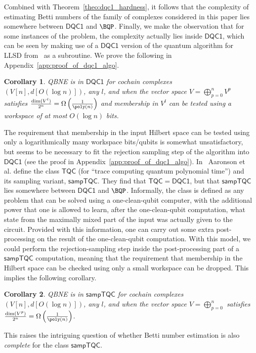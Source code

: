 \documentclass[11pt]{article}
\numberwithin{equation}{section}
\newcommand{\DQC}{\mathsf{DQC1}}
\renewcommand\( {\left(}
\renewcommand\) {\right)}
\newtheorem{corollary}{Corollary}
\begin{document}
Combined with Theorem~\ref{theo:dqc1_hardness}, it follows that the complexity of estimating Betti numbers of the family of complexes considered in this paper lies somewhere between $\DQC$ and $\BQP$. Finally, we make the observation that for some instances of the problem, the complexity actually lies inside $\DQC$, which can be seen by making use of a $\DQC$ version of the quantum algorithm for {\sc LLSD} from~\cite{gyurik} as a subroutine. We prove the following in Appendix~\ref{app:proof_of_dqc1_algo}.

\begin{corollary}\label{cor:dqc1_betti_algo}
	{\sc QBNE} is in $\DQC$ for cochain complexes $(V[n],d[O(\log n)])$, any $l$, and when the vector space $V = \bigoplus_{p=0}^n V^p$ satisfies $\frac{\dim(V^l)}{2^n} = \Omega\left(\frac{1}{\poly(n)}\right)$ \emph{and} membership in $V^l$ can be tested using a workspace of at most $O(\log n)$ bits.
\end{corollary}
The requirement that membership in the input Hilbert space can be tested using only a logarithmically many workspace bits/qubits is somewhat unsatisfactory, but seems to be necessary to fit the rejection sampling step of the algorithm into $\DQC$ (see the proof in Appendix~\ref{app:proof_of_dqc1_algo}). In~\cite{aaronson2017computational} Aaronson et al. define the class $\mathsf{TQC}$ (for ``trace computing quantum polynomial time'') and its sampling variant, $\mathsf{sampTQC}$. They find that $\mathsf{TQC} = \DQC$, but that $\mathsf{sampTQC}$  lies somewhere between $\DQC$ and $\BQP$. Informally, the class is defined as any problem that can be solved using a one-clean-qubit computer, with the additional power that one is allowed to learn, after the one-clean-qubit computation, what state from the maximally mixed part of the input was actually given to the circuit. Provided with this information, one can carry out some extra post-processing on the result of the one-clean-qubit computation. With this model, we could perform the rejection-sampling step inside the post-processing part of a $\mathsf{sampTQC}$ computation, meaning that the requirement that membership in the Hilbert space can be checked using only a small workspace can be dropped. This implies the following corollary.
\begin{corollary}
	{\sc QBNE} is in $\mathsf{sampTQC}$ for cochain complexes $(V[n],d[O(\log n)])$, any $l$, and when the vector space $V = \bigoplus_{p=0}^n$ satisfies $\frac{\dim(V^p)}{2^n} = \Omega\left(\frac{1}{\poly(n)}\right)$.
\end{corollary}
This raises the intriguing question of whether Betti number estimation is also \emph{complete} for the class $\mathsf{sampTQC}$. 
\end{document}
